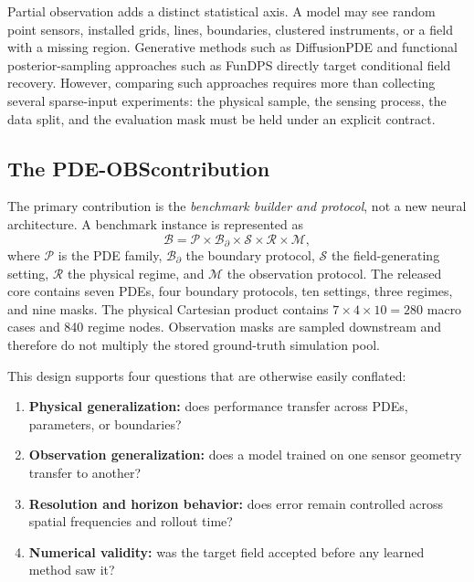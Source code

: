 \documentclass[10pt]{article}
\newcommand{\dataset}{\textsc{PDE-OBS}}
\begin{document}
Partial observation adds a distinct statistical axis.  A model may see random
point sensors, installed grids, lines, boundaries, clustered instruments, or a
field with a missing region.  Generative methods such as DiffusionPDE
\citep{tang2024diffusionpde} and functional posterior-sampling approaches such
as FunDPS \citep{chung2025fundps} directly target conditional field recovery.
However, comparing such approaches requires more than collecting several
sparse-input experiments: the physical sample, the sensing process, the data
split, and the evaluation mask must be held under an explicit contract.

\subsection{The \dataset contribution}

The primary contribution is the \emph{benchmark builder and protocol}, not a
new neural architecture.  A benchmark instance is represented as
\begin{equation}
  \mathcal{B} = \mathcal{P}\times\mathcal{B}_{\partial}
  \times\mathcal{S}\times\mathcal{R}\times\mathcal{M},
  \label{eq:factorization}
\end{equation}
where $\mathcal{P}$ is the PDE family, $\mathcal{B}_{\partial}$ the boundary
protocol, $\mathcal{S}$ the field-generating setting, $\mathcal{R}$ the
physical regime, and $\mathcal{M}$ the observation protocol.  The released
core contains seven PDEs, four boundary protocols, ten settings, three
regimes, and nine masks.  The physical Cartesian product contains
$7\times4\times10=280$ macro cases and 840 regime nodes.  Observation masks
are sampled downstream and therefore do not multiply the stored ground-truth
simulation pool.

This design supports four questions that are otherwise easily conflated:
\begin{enumerate}
  \item \textbf{Physical generalization:} does performance transfer across
  PDEs, parameters, or boundaries?
  \item \textbf{Observation generalization:} does a model trained on one
  sensor geometry transfer to another?
  \item \textbf{Resolution and horizon behavior:} does error remain controlled
  across spatial frequencies and rollout time?
  \item \textbf{Numerical validity:} was the target field accepted before any
  learned method saw it?
\end{enumerate}
\end{document}
